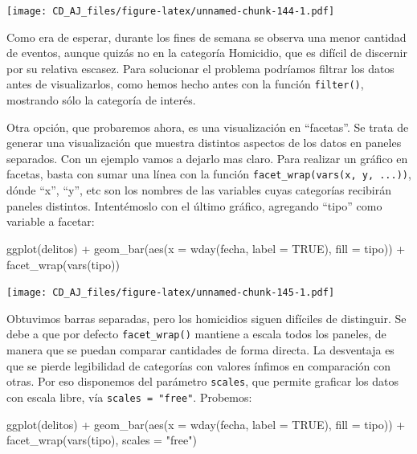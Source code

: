 \documentclass[
]{book}
\newenvironment{Shaded}{\begin{snugshade}}{\end{snugshade}}
\newcommand{\AttributeTok}[1]{\textcolor[rgb]{0.77,0.63,0.00}{#1}}
\newcommand{\ConstantTok}[1]{\textcolor[rgb]{0.00,0.00,0.00}{#1}}
\newcommand{\FunctionTok}[1]{\textcolor[rgb]{0.00,0.00,0.00}{#1}}
\newcommand{\NormalTok}[1]{#1}
\newcommand{\SpecialCharTok}[1]{\textcolor[rgb]{0.00,0.00,0.00}{#1}}
\newcommand{\StringTok}[1]{\textcolor[rgb]{0.31,0.60,0.02}{#1}}
\begin{document}
\texttt{[image: CD\_AJ\_files/figure-latex/unnamed-chunk-144-1.pdf]}

Como era de esperar, durante los fines de semana se observa una menor cantidad de eventos, aunque quizás no en la categoría Homicidio, que es difícil de discernir por su relativa escasez. Para solucionar el problema podríamos filtrar los datos antes de visualizarlos, como hemos hecho antes con la función \texttt{filter()}, mostrando sólo la categoría de interés.

Otra opción, que probaremos ahora, es una visualización en ``facetas''. Se trata de generar una visualización que muestra distintos aspectos de los datos en paneles separados. Con un ejemplo vamos a dejarlo mas claro. Para realizar un gráfico en facetas, basta con sumar una línea con la función \texttt{facet\_wrap(vars(x,\ y,\ ...))}, dónde ``x'', ``y'', etc son los nombres de las variables cuyas categorías recibirán paneles distintos. Intentémoslo con el último gráfico, agregando ``tipo'' como variable a facetar:

\begin{Shaded}
\begin{Highlighting}[]
\FunctionTok{ggplot}\NormalTok{(delitos) }\SpecialCharTok{+} 
    \FunctionTok{geom\_bar}\NormalTok{(}\FunctionTok{aes}\NormalTok{(}\AttributeTok{x =} \FunctionTok{wday}\NormalTok{(fecha, }\AttributeTok{label =} \ConstantTok{TRUE}\NormalTok{), }\AttributeTok{fill =}\NormalTok{ tipo)) }\SpecialCharTok{+}
    \FunctionTok{facet\_wrap}\NormalTok{(}\FunctionTok{vars}\NormalTok{(tipo))}
\end{Highlighting}
\end{Shaded}

\texttt{[image: CD\_AJ\_files/figure-latex/unnamed-chunk-145-1.pdf]}

Obtuvimos barras separadas, pero los homicidios siguen difíciles de distinguir. Se debe a que por defecto \texttt{facet\_wrap()} mantiene a escala todos los paneles, de manera que se puedan comparar cantidades de forma directa. La desventaja es que se pierde legibilidad de categorías con valores ínfimos en comparación con otras. Por eso disponemos del parámetro \texttt{scales}, que permite graficar los datos con escala libre, vía \texttt{scales\ =\ "free"}. Probemos:

\begin{Shaded}
\begin{Highlighting}[]
\FunctionTok{ggplot}\NormalTok{(delitos) }\SpecialCharTok{+} 
    \FunctionTok{geom\_bar}\NormalTok{(}\FunctionTok{aes}\NormalTok{(}\AttributeTok{x =} \FunctionTok{wday}\NormalTok{(fecha, }\AttributeTok{label =} \ConstantTok{TRUE}\NormalTok{), }\AttributeTok{fill =}\NormalTok{ tipo)) }\SpecialCharTok{+}
    \FunctionTok{facet\_wrap}\NormalTok{(}\FunctionTok{vars}\NormalTok{(tipo), }\AttributeTok{scales =} \StringTok{"free"}\NormalTok{)}
\end{Highlighting}
\end{Shaded}
\end{document}
